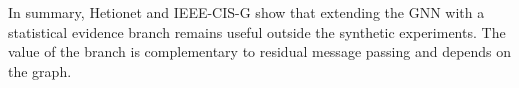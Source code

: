 In summary, Hetionet and IEEE-CIS-G show that extending the GNN with a
statistical evidence branch remains useful outside the synthetic experiments.
The value of the branch is complementary to residual message passing and depends
on the graph.

